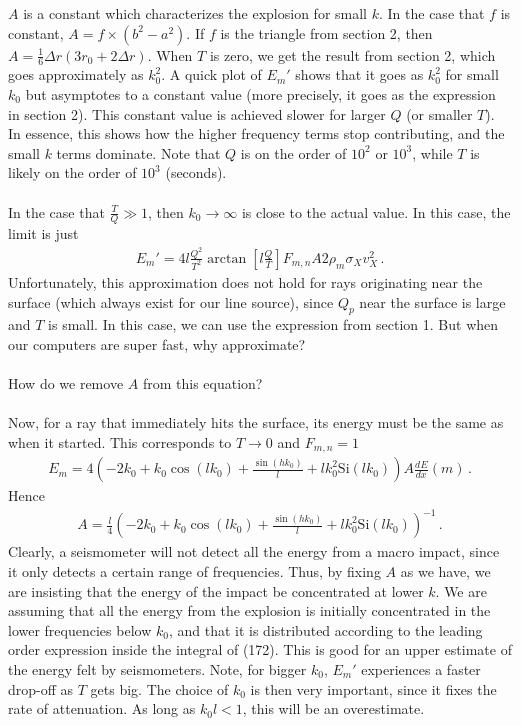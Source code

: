 \documentclass{article}
\newcommand*\te[1]{\text{#1}}
\newcommand*\p[1]{\left(#1\right)}
\newcommand*\ps[1]{\left[#1\right]}
\newcommand*\f[2]{\frac{#1}{#2}}
\newcommand*\td[3]{\frac{d^{#3}#1}{d #2^{#3}}}
\begin{document}
$A$ is a constant which characterizes the explosion for small $k$. In the case that $f$ is constant, $A = f\times (b^2-a^2)$. If $f$ is the triangle from section 2, then $A = \f16\Delta r(3r_0 + 2\Delta r)$. When $T$ is zero, we get the result from section 2, which goes approximately as $k_0^2$. A quick plot of $E_m'$ shows that it goes as $k_0^2$ for small $k_0$ but asymptotes to a constant value (more precisely, it goes as the expression in section 2). This constant value is achieved slower for larger $Q$ (or smaller $T$). In essence, this shows how the higher frequency terms stop contributing, and the small $k$ terms dominate. Note that $Q$ is on the order of $10^2$ or $10^3$, while $T$ is likely on the order of $10^3$ (seconds).
\\\\
In the case that $\f{T}{Q}\gg 1$, then $k_0\to\infty$ is close to the actual value. In this case, the limit is just
\begin{align}
E_m' =  4 l  \f{Q^2}{T^2} \arctan\ps{l\f{Q}{T}} F_{m,n} A2\rho_m\sigma_Xv_X^2\,.
\end{align}
Unfortunately, this approximation does not hold for rays originating near the surface (which always exist for our line source), since $Q_p$ near the surface is large and $T$ is small. In this case, we can use the expression from section 1. But when our computers are super fast, why approximate?
\\\\
How do we remove $A$ from this equation?
\\\\
Now, for a ray that immediately hits the surface, its energy must be the same as when it started. This corresponds to $T \to 0$ and $F_{m,n} = 1$
\begin{align}
E_m = 4\p{-2k_0+k_0\cos(l k_0)+\f{\sin(h k_0)}{l}+l k_0^2\te{Si}(l k_0)} A \td{E}{x}{}(m)\,.
\end{align}
Hence
\begin{align}
A = \f{l}{4} \p{-2k_0+k_0\cos(l k_0)+\f{\sin(h k_0)}{l}+l k_0^2\te{Si}(l k_0)}^{-1}\,.
\end{align}
Clearly, a seismometer will not detect all the energy from a macro impact, since it only detects a certain range of frequencies. Thus, by fixing $A$ as we have, we are insisting that the energy of the impact be concentrated at lower $k$. We are assuming that all the energy from the explosion is initially concentrated in the lower frequencies below $k_0$, and that it is distributed according to the leading order expression inside the integral of (172). This is good for an upper estimate of the energy felt by seismometers. Note, for bigger $k_0$, $E_m'$ experiences a faster drop-off as $T$ gets big. The choice of $k_0$ is then very important, since it fixes the rate of attenuation. As long as $k_0 l<1$, this will be an overestimate. 
\end{document}

